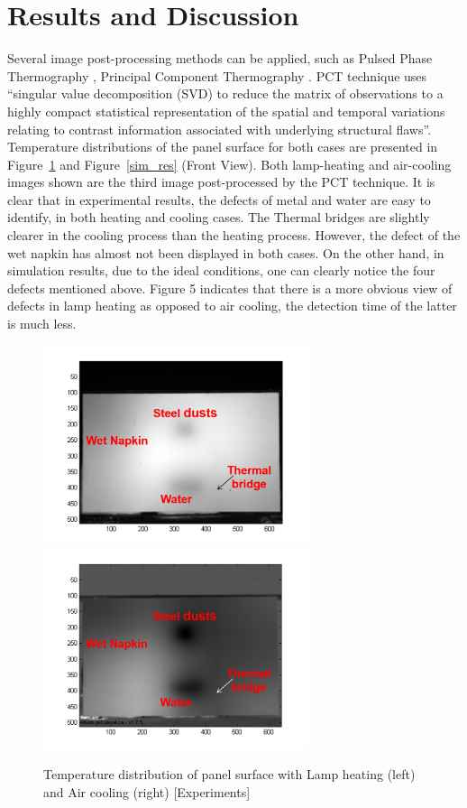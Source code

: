 \documentclass{tQRT2e}
\begin{document}
\section{Results and Discussion}
Several image post-processing methods can be applied, such as Pulsed Phase Thermography \cite{Maldague1996}, Principal Component Thermography \cite{Rajic2002}. PCT technique uses “singular value decomposition (SVD) to reduce the matrix of observations to a highly compact statistical representation of the spatial and temporal variations relating to contrast information associated with underlying structural flaws”. Temperature distributions of the panel surface for both cases are presented in Figure~\ref{exp_res} and Figure~\ref{sim_res} (Front View). Both lamp-heating and air-cooling images shown are the third image post-processed by the PCT technique. It is clear that in experimental results, the defects of metal and water are easy to identify, in both heating and cooling cases. The Thermal bridges are slightly clearer in the cooling process than the heating process. However, the defect of the wet napkin has almost not been displayed in both cases. On the other hand, in simulation results, due to the ideal conditions, one can clearly notice the four defects mentioned above. Figure 5 indicates that there is a more obvious view of defects in lamp heating as opposed to air cooling, the detection time of the latter is much less.
\begin{figure}
	\includegraphics[width=7.8cm, height=5.85cm]{Heat_FT_AMP}
	\includegraphics[width=7.8cm, height=5.85cm]{Cool_PCT3_2}
	\caption{Temperature distribution of panel surface with Lamp heating (left) and Air cooling (right) [Experiments]}
	\label{exp_res}
\end{figure}
\end{document}
